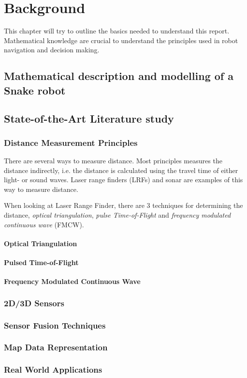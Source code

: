 

\chapter{Background}
This chapter will try to outline the basics needed to understand this report. Mathematical
knowledge are crucial to understand the principles used in robot navigation and decision
making. 


\section{Mathematical description and modelling of a Snake robot}


\section{State-of-the-Art Literature study}


\subsection{Distance Measurement Principles}
There are several ways to measure distance. Most principles measures the distance
indirectly, i.e. the distance is calculated using the travel time of either light- or
sound waves. Laser range finders (LRFs) and sonar are examples of this way to measure
distance. 

When looking at Laser Range Finder, there are 3 techniques for determining the distance,
\emph{optical triangulation}, \emph{pulse Time-of-Flight} and \emph{frequency modulated
continuous wave} (FMCW). \cite{laser-ranging-critical-review}

\subsubsection{Optical Triangulation}



\subsubsection{Pulsed Time-of-Flight}



\subsubsection{Frequency Modulated Continuous Wave}



\subsection{2D/3D Sensors}




\subsection{Sensor Fusion Techniques}


\subsection{Map Data Representation}


\subsection{Real World Applications}



